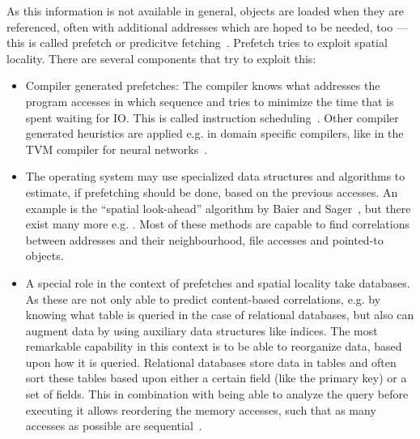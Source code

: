     As this information is not available in general, objects are loaded when they are referenced, often with additional addresses which are hoped to be needed, too --- this is called prefetch or predicitve fetching~\autocite{stallings2012operating, jacob2010memory}. 
    Prefetch tries to exploit spatial locality. There are several components that try to exploit this:
    \begin{itemize}
     \item Compiler generated prefetches: 
     The compiler knows what addresses the program accesses in which sequence and tries to minimize the time that is spent waiting for IO. 
     This is called instruction scheduling~\autocite{aho1986compilers}. 
     Other compiler generated heuristics are applied e.g. in domain specific compilers, like in the TVM compiler for neural networks~\autocite{chen2018tvm}.
     
     \item The operating system may use specialized data structures and algorithms to estimate, if prefetching should be done, based on the previous accesses. 
     An example is the ``spatial look-ahead'' algorithm by Baier and Sager~\autocite{jacob2010memory, baier1976dynamic}, but there exist many more e.g. \autocite{joseph1999prefetching, griffioen1994reducing, kroeger1997exploring, cooksey2002stateless}. 
     Most of these methods are capable to find correlations between addresses and their neighbourhood, file accesses and pointed-to objects.
     
     \item A special role in the context of prefetches and spatial locality take databases. 
     As these are not only able to predict content-based correlations, e.g. by knowing what table is queried in the case of relational databases, but also can augment data by using auxiliary data structures like indices. 
     The most remarkable capability in this context is to be able to reorganize data, based upon how it is queried.
     Relational databases store data in tables and often sort these tables based upon either a certain field (like the primary key) or a set of fields. 
     This in combination with being able to analyze the query before executing it allows reordering the memory accesses, such that as many accesses as possible are sequential~\autocite{ramakrishnan2000database, silberschatz1997database}.
    \end{itemize}
    
